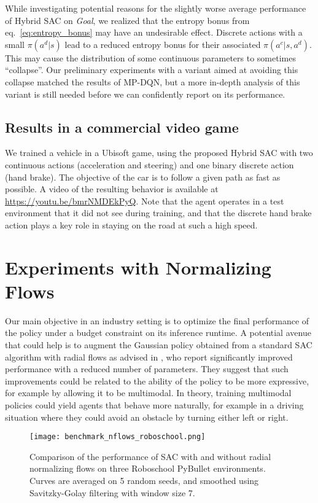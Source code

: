 \documentclass[letterpaper]{article} \usepackage{aaai20}  \usepackage{times}  \usepackage{helvet} \usepackage{courier}  \usepackage[hyphens]{url}  \usepackage{graphicx} \urlstyle{rm} \def\UrlFont{\rm}  \usepackage{graphicx}  \usepackage[section]{placeins}
\begin{document}
While investigating potential reasons for the slightly worse average performance of Hybrid SAC on {\em Goal}, we realized that the entropy bonus from eq.~\ref{eq:entropy_bonus} may have an undesirable effect.
Discrete actions with a small $\pi(a^d | s)$ lead to a reduced entropy bonus for their associated $\pi(a^c | s, a^d)$.
This may cause the distribution of some continuous parameters to sometimes ``collapse''.
Our preliminary experiments with a variant aimed at avoiding this collapse matched the results of MP-DQN, but a more in-depth analysis of this variant is still needed before we can confidently report on its performance.

\subsection{Results in a commercial video game}

We trained a vehicle in a Ubisoft game, using the proposed Hybrid SAC with two continuous actions (acceleration and steering) and one binary discrete action (hand brake). The objective of the car is to follow a given path as fast as possible. A video of the resulting behavior is available at \url{https://youtu.be/bmrNMDEkPyQ}. Note that the agent operates in a test environment that it did not see during training, and that the discrete hand brake action plays a key role in staying on the road at such a high speed.


\section{Experiments with Normalizing Flows}

Our main objective in an industry setting is to optimize the final performance of the policy under a budget constraint on its inference runtime. A potential avenue that could help is to augment the Gaussian policy obtained from a standard SAC algorithm with radial flows as advised in \cite{mazoure2019leveraging}, who report significantly improved performance with a reduced number of parameters. They suggest that such improvements could be related to the ability of the policy to be more expressive, for example by allowing it to be multimodal. In theory, training multimodal policies could yield agents that behave more naturally, for example in a driving situation where they could avoid an obstacle by turning either left or right.

\begin{figure*}[h]
\centering
\texttt{[image: benchmark\_nflows\_roboschool.png]} \caption{Comparison of the performance of SAC with and without radial normalizing flows on three Roboschool PyBullet environments. Curves are averaged on 5 random seeds, and smoothed using Savitzky-Golay filtering with window size 7.}
\label{fig_benchmark_roboschool}
\end{figure*}
\end{document}
